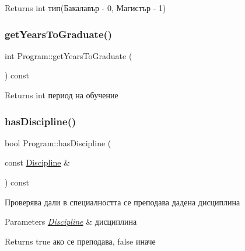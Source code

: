 \begin{DoxyReturn}{Returns}
int тип(Бакалавър -\/ 0, Магистър -\/ 1) 
\end{DoxyReturn}
\mbox{\label{class_program_a10ec5f4daf928ba6935fa7f23658e668}} 
\subsubsection{\texorpdfstring{get\+Years\+To\+Graduate()}{getYearsToGraduate()}}
{\footnotesize\ttfamily int Program\+::get\+Years\+To\+Graduate (\begin{DoxyParamCaption}{ }\end{DoxyParamCaption}) const}

\begin{DoxyReturn}{Returns}
int период на обучение 
\end{DoxyReturn}
\mbox{\label{class_program_a050a111ad405a288aedb95de0ada2146}} 
\subsubsection{\texorpdfstring{has\+Discipline()}{hasDiscipline()}}
{\footnotesize\ttfamily bool Program\+::has\+Discipline (\begin{DoxyParamCaption}\item[{const \hyperlink{class_discipline}{Discipline} \&}]{ }\end{DoxyParamCaption}) const}



Проверява дали в специалността се преподава дадена дисциплина 


\begin{DoxyParams}{Parameters}
{\em \hyperlink{class_discipline}{Discipline}} & дисциплина \\
\hline
\end{DoxyParams}
\begin{DoxyReturn}{Returns}
true ако се преподава, false иначе 
\end{DoxyReturn}
\mbox{\label{class_program_a7eb820964390f06b3170e467af2631fb}} 
